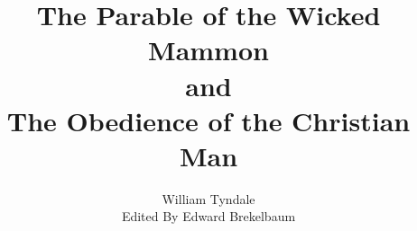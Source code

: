 \documentclass{book}
\begin{document}
\frontmatter
\title{\textbf{The Parable of the Wicked Mammon\\
and\\
The Obedience of the Christian Man}}

\author{William Tyndale\\
Edited By Edward Brekelbaum}
\date{}
\maketitle

\tableofcontents

\mainmatter


\end{document}

